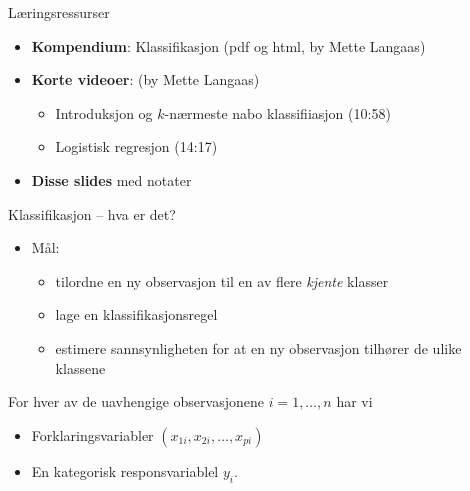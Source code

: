 \documentclass[10pt,ignorenonframetext,]{beamer}
\providecommand{\tightlist}{%
  \setlength{\itemsep}{0pt}\setlength{\parskip}{0pt}}
\begin{document}
\begin{frame}{Læringsressurser}
\protect\hypertarget{luxe6ringsressurser}{}

\vspace{2mm}

\vspace{2mm}

\begin{itemize}
\item
  \textbf{Kompendium}: Klassifikasjon (pdf og html, by Mette Langaas)
\item
  \textbf{Korte videoer}: (by Mette Langaas)

  \begin{itemize}
  \tightlist
  \item
    Introduksjon og \(k\)-nærmeste nabo klassifiiasjon (10:58)
  \item
    Logistisk regresjon (14:17)
  \end{itemize}
\item
  \textbf{Disse slides} med notater
\end{itemize}

\end{frame}

\begin{frame}{Klassifikasjon -- hva er det?}
\protect\hypertarget{klassifikasjon-hva-er-det}{}

\begin{itemize}
\item
  Mål:

  \begin{itemize}
  \item
    tilordne en ny observasjon til en av flere \emph{kjente} klasser
  \item
    lage en klassifikasjonsregel
  \item
    estimere sannsynligheten for at en ny observasjon tilhører de ulike
    klassene
  \end{itemize}
\end{itemize}

\vspace{2mm}

For hver av de uavhengige observasjonene \(i=1,\ldots,n\) har vi

\begin{itemize}
\tightlist
\item
  Forklaringsvariabler \((x_{1i},x_{2i},\ldots,x_{pi})\)
\item
  En kategorisk responsvariablel \(y_i\).
\end{itemize}

\end{frame}
\end{document}
